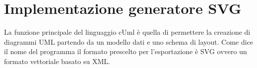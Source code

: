 \section{Implementazione generatore SVG}

La funzione principale del linguaggio cUml è quella di permettere la creazione 
di diagrammi UML partendo da un modello dati e uno schema di layout.
Come dice il nome del programma il formato prescelto per l'esportazione è SVG
ovvero un formato vettoriale basato su XML.

